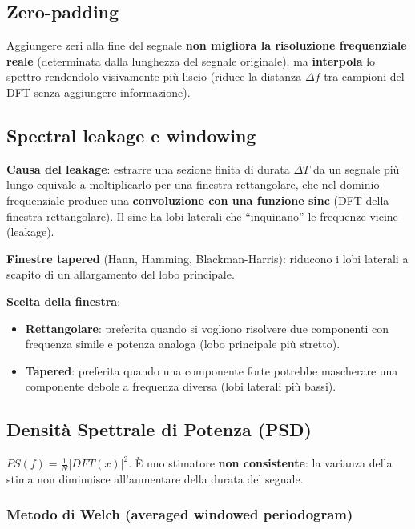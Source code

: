 \subsection{Zero-padding}

Aggiungere zeri alla fine del segnale \textbf{non migliora la risoluzione frequenziale reale} (determinata dalla lunghezza del segnale originale), ma \textbf{interpola} lo spettro rendendolo visivamente più liscio (riduce la distanza $\Delta f$ tra campioni del DFT senza aggiungere informazione).

\subsection{Spectral leakage e windowing}

\textbf{Causa del leakage}: estrarre una sezione finita di durata $\Delta T$ da un segnale più lungo equivale a moltiplicarlo per una finestra rettangolare, che nel dominio frequenziale produce una \textbf{convoluzione con una funzione sinc} (DFT della finestra rettangolare). Il sinc ha lobi laterali che ``inquinano'' le frequenze vicine (leakage).

\textbf{Finestre tapered} (Hann, Hamming, Blackman-Harris): riducono i lobi laterali a scapito di un allargamento del lobo principale.

\textbf{Scelta della finestra}:
\begin{itemize}
    \item \textbf{Rettangolare}: preferita quando si vogliono risolvere due componenti con frequenza simile e potenza analoga (lobo principale più stretto).
    \item \textbf{Tapered}: preferita quando una componente forte potrebbe mascherare una componente debole a frequenza diversa (lobi laterali più bassi).
\end{itemize}

\subsection{Densità Spettrale di Potenza (PSD)}

\begin{definizione}[-- Periodogramma]
$PS(f) = \frac{1}{N} |DFT(x)|^2$. È uno stimatore \textbf{non consistente}: la varianza della stima non diminuisce all'aumentare della durata del segnale.
\end{definizione}

\subsubsection{Metodo di Welch (averaged windowed periodogram)}

